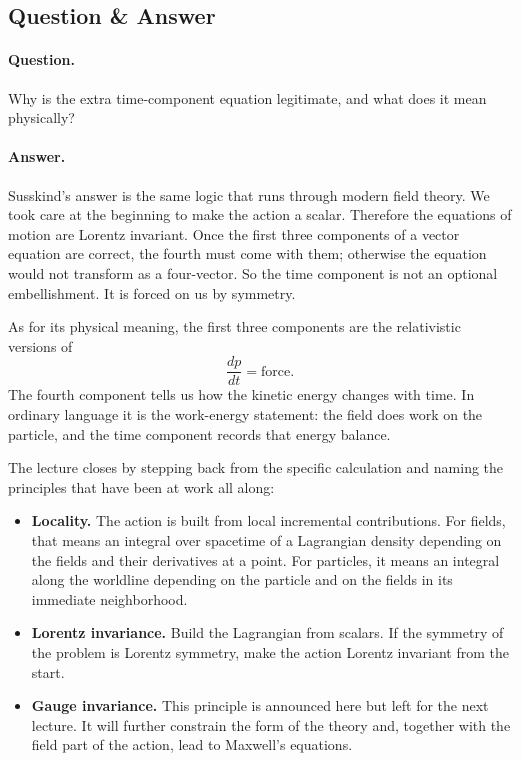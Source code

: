 \subsection{Question \& Answer}

\paragraph{Question.} Why is the extra time-component equation legitimate, and what does it mean physically?

\paragraph{Answer.} Susskind's answer is the same logic that runs through modern field theory. We took care at the beginning to make the action a scalar. Therefore the equations of motion are Lorentz invariant. Once the first three components of a vector equation are correct, the fourth must come with them; otherwise the equation would not transform as a four-vector. So the time component is not an optional embellishment. It is forced on us by symmetry.

As for its physical meaning, the first three components are the relativistic versions of
\[
\frac{dp}{dt}=\text{force}.
\]
The fourth component tells us how the kinetic energy changes with time. In ordinary language it is the work-energy statement: the field does work on the particle, and the time component records that energy balance.

The lecture closes by stepping back from the specific calculation and naming the principles that have been at work all along:
\begin{itemize}
\item \textbf{Locality.} The action is built from local incremental contributions. For fields, that means an integral over spacetime of a Lagrangian density depending on the fields and their derivatives at a point. For particles, it means an integral along the worldline depending on the particle and on the fields in its immediate neighborhood.
\item \textbf{Lorentz invariance.} Build the Lagrangian from scalars. If the symmetry of the problem is Lorentz symmetry, make the action Lorentz invariant from the start.
\item \textbf{Gauge invariance.} This principle is announced here but left for the next lecture. It will further constrain the form of the theory and, together with the field part of the action, lead to Maxwell's equations.
\end{itemize}

